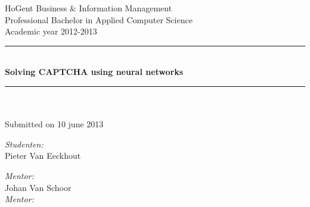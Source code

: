 \documentclass[pdftex,a4paper,12pt,twoside]{report}
\newcommand{\HRule}{\rule{\linewidth}{0.5mm}}
\newcommand{\emptypage}{
\newpage
\thispagestyle{empty}
\mbox{}
\newpage
}
\newcommand{\studenta}{Pieter {Van Eeckhout}}
\newcommand{\begeleider}{Johan {Van Schoor}}
\newcommand{\titel}{Solving CAPTCHA using neural networks}
\newcommand{\ondertitel}{}
\newcommand{\datum}{10 june 2013}
\newcommand{\academiejaar}{2012-2013}
\begin{document}

\emptypage


\begin{titlepage}
\begin{center}
HoGent Business \& Information Management\\
Professional Bachelor in Applied Computer Science\\
Academic year \academiejaar

\vfill

\HRule \\[0.4cm]
{ \huge \bfseries \titel}\\[0.4cm]
\HRule \\[0.4cm]

{\Large \ondertitel}\\[0.4cm]

Submitted on \datum

\vfill

\begin{minipage}{0.49\textwidth}
\begin{flushleft}
\emph{Student\ifdefined\studentb en\fi :}\\
\studenta \\
\ifdefined\studentb \studentb \fi\par
\end{flushleft}
\end{minipage}
\begin{minipage}{0.49\textwidth}
\begin{flushright}
\emph{Mentor:}\\ \begeleider\\
\ifdefined\mentor \emph{Mentor:}\\ \mentor \fi
\end{flushright}
\end{minipage}

\end{center}

\end{titlepage}


\tableofcontents


\begin{abstract}


\end{abstract}
\end{document}
